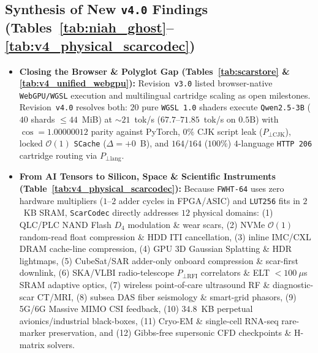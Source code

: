 \documentclass[10pt,twocolumn]{article}
\begin{document}
\subsection{Synthesis of New \texttt{v4.0} Findings (Tables~\ref{tab:niah_ghost}--\ref{tab:v4_physical_scarcodec})}
\begin{itemize}
    \item \textbf{Closing the Browser \& Polyglot Gap (Tables~\ref{tab:scarstore} \& \ref{tab:v4_unified_webgpu}):} Revision~\texttt{v3.0} listed browser-native \texttt{WebGPU/WGSL} execution and multilingual cartridge scaling as open milestones. Revision~\texttt{v4.0} resolves both: $20$ pure \texttt{WGSL 1.0} shaders execute \texttt{Qwen2.5-3B} ($40$ shards $\le 44$~MiB) at $\sim 21$~tok/s ($67.7$--$71.85$~tok/s on $0.5\text{B}$) with $\cos=1.00000012$ parity against PyTorch, $0\%$ CJK script leak ($P_{\perp\text{CJK}}$), locked $\mathcal{O}(1)$ \texttt{SCache} ($\Delta=+0$~B), and $164/164$ ($100\%$) $4$-language \texttt{HTTP 206} cartridge routing via $P_{\perp\text{lang}}$.
    \item \textbf{From AI Tensors to Silicon, Space \& Scientific Instruments (Table~\ref{tab:v4_physical_scarcodec}):} Because \texttt{FWHT-64} uses zero hardware multipliers ($1$--$2$ adder cycles in FPGA/ASIC) and \texttt{LUT256} fits in $2$~KB SRAM, \texttt{ScarCodec} directly addresses $12$ physical domains: (1) QLC/PLC NAND Flash $D_4$ modulation \& wear scars, (2) NVMe $\mathcal{O}(1)$ random-read float compression \& HDD ITI cancellation, (3) inline IMC/CXL DRAM cache-line compression, (4) GPU 3D Gaussian Splatting \& HDR lightmaps, (5) CubeSat/SAR adder-only onboard compression \& scar-first downlink, (6) SKA/VLBI radio-telescope $P_{\perp\text{RFI}}$ correlators \& ELT $<100~\mu$s SRAM adaptive optics, (7) wireless point-of-care ultrasound RF \& diagnostic-scar CT/MRI, (8) subsea DAS fiber seismology \& smart-grid phasors, (9) 5G/6G Massive MIMO CSI feedback, (10) $34.8$~KB perpetual avionics/industrial black-boxes, (11) Cryo-EM \& single-cell RNA-seq rare-marker preservation, and (12) Gibbs-free supersonic CFD checkpoints \& H-matrix solvers.
\end{itemize}
\end{document}
